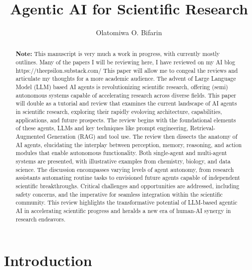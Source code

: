 \documentclass{article}
\title{Agentic AI for Scientific Research}
\author{Olatomiwa O. Bifarin}
\affil{School of Chemistry and Biochemistry\\Georgia Institute of Technology}
\begin{document}
\maketitle

\begin{abstract}
{\color{red}\textbf{Note:} This manuscript is very much a work in progress, with 
    currently mostly outlines. Many of the papers I will be reviewing here, I have 
    reviewed on my AI blog https://theepsilon.substack.com/ This paper will 
    allow me to congeal the reviews and articulate my thoughts for a more academic audience.}    
    The advent of Large Language Model (LLM) based AI agents is revolutionizing scientific research, 
    offering (semi) autonomous systems capable of accelerating research across diverse fields. 
    This paper will double as a tutorial and review that examines the current landscape of AI agents 
    in scientific research, exploring their rapidly evoloving architecture, 
    capabilities, applications, and future prospects. The review begins with the foundational 
    elements of these agents, LLMs and key techniques like prompt engineering, Retrieval-Augmented Generation (RAG)
    and tool use. The review then dissects the anatomy of AI agents, elucidating the interplay 
    between perception, memory, reasoning, and action modules that enable autonomous functionality. 
    Both single-agent and multi-agent systems are presented, with illustrative examples from chemistry, 
    biology, and data science. The discussion encompasses varying levels of agent autonomy, from research 
    assistants automating routine tasks to envisioned future agents capable of independent scientific 
    breakthroughs. Critical challenges and opportunities are addressed, including safety concerns, 
    and the imperative for seamless integration within the scientific community. This review highlights the 
    transformative potential of LLM-based agentic AI in accelerating scientific progress and heralds a 
    new era of human-AI synergy in research endeavors.
\end{abstract}

\section{Introduction}
\end{document}
